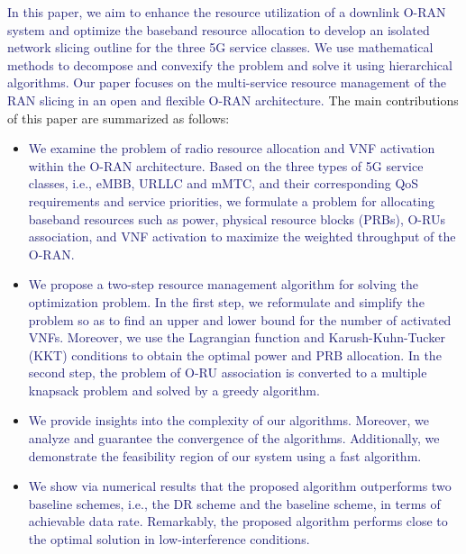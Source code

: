 \documentclass[lettersize,journal]{IEEEtran}
\begin{document}
\textcolor{MidnightBlue}{In this paper, we aim to enhance the resource utilization of a downlink O-RAN system and optimize the baseband resource allocation to develop an isolated network slicing outline for the three 5G service classes.
We use mathematical methods to decompose and convexify the problem and solve it using hierarchical algorithms.
Our paper focuses on the multi-service resource management of the RAN slicing in an open and flexible O-RAN architecture.}
 The main contributions of this paper are summarized as follows:
\begin{itemize}
\item \textcolor{MidnightBlue}{We examine the problem of radio resource allocation and VNF activation within the O-RAN architecture.
Based on the three types of 5G service classes, i.e., eMBB, URLLC and mMTC, and their corresponding QoS requirements and service priorities, we formulate a problem for allocating baseband resources such as power, physical resource blocks (PRBs), O-RUs association, and VNF activation to maximize the weighted throughput of the O-RAN.}
\item \textcolor{MidnightBlue}{We propose a two-step resource management algorithm for solving the optimization problem.
In the first step, we reformulate and simplify the problem so as to find an upper and lower bound for the number of activated VNFs. Moreover, we use the Lagrangian function and Karush-Kuhn-Tucker (KKT) conditions to obtain the optimal power and PRB allocation. In the second step, the problem of O-RU association is converted to a multiple knapsack problem and solved by a greedy algorithm.}
\item \textcolor{MidnightBlue}{We provide insights into the complexity of our algorithms. Moreover, we analyze and guarantee the convergence of the algorithms. Additionally, we demonstrate the feasibility region of our system using a fast algorithm.}
\item \textcolor{MidnightBlue}{We show via numerical results that the proposed algorithm outperforms two baseline schemes, i.e., the DR scheme and the baseline scheme, in terms of achievable data rate. Remarkably, the proposed algorithm performs close to the optimal solution in low-interference conditions.}
\end{itemize}
\end{document}
